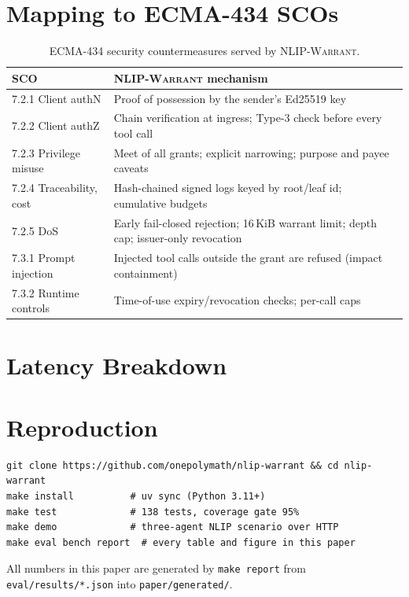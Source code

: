 \documentclass[sigconf,nonacm]{acmart}
\newcommand{\sys}{\textsc{NLIP-Warrant}}
\newcommand{\code}[1]{\texttt{\small #1}}
\begin{document}
\section{Mapping to ECMA-434 SCOs}\label{app:sco}
\begin{table}[H]
\caption{ECMA-434 security countermeasures served by \sys{}.}
\small
\begin{tabular}{@{}p{2.2cm}p{5.6cm}@{}}
\toprule
SCO & \sys{} mechanism \\
\midrule
7.2.1 Client authN & Proof of possession by the sender's Ed25519 key \\
7.2.2 Client authZ & Chain verification at ingress; Type-3 check before every tool call \\
7.2.3 Privilege misuse & Meet of all grants; explicit narrowing; purpose and payee caveats \\
7.2.4 Traceability, cost & Hash-chained signed logs keyed by root/leaf id; cumulative budgets \\
7.2.5 DoS & Early fail-closed rejection; 16\,KiB warrant limit; depth cap; issuer-only revocation \\
7.3.1 Prompt injection & Injected tool calls outside the grant are refused (impact containment) \\
7.3.2 Runtime controls & Time-of-use expiry/revocation checks; per-call caps \\
\bottomrule
\end{tabular}
\end{table}

\section{Latency Breakdown}
\begin{table}[H]
\caption{Median cost by chain depth (2{,}000 iterations).}
\label{tab:latency}
\small

\end{table}

\section{Reproduction}
\begin{lstlisting}
git clone https://github.com/onepolymath/nlip-warrant && cd nlip-warrant
make install          # uv sync (Python 3.11+)
make test             # 138 tests, coverage gate 95%
make demo             # three-agent NLIP scenario over HTTP
make eval bench report  # every table and figure in this paper
\end{lstlisting}
All numbers in this paper are generated by \code{make report} from \code{eval/results/*.json} into \code{paper/generated/}.
\end{document}
